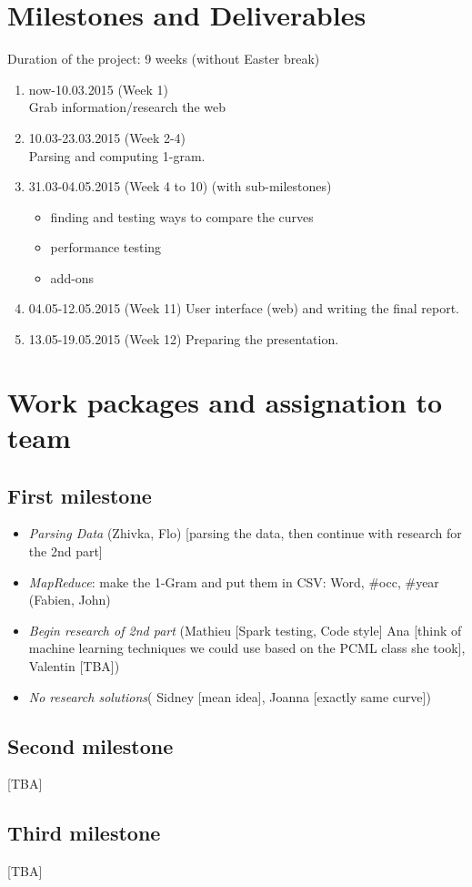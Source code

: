 \documentclass{article}
\begin{document}
\section{Milestones and Deliverables}
Duration of the project: 9 weeks (without Easter break)
\begin{enumerate}
\item now-10.03.2015 (Week 1)\\
Grab information/research the web
\item 10.03-23.03.2015 (Week 2-4)\\
Parsing and computing 1-gram.
\item 31.03-04.05.2015 (Week 4 to 10) (with sub-milestones) \\
\begin{itemize}
\item finding and testing ways to compare the curves 
\item performance testing 
\item add-ons
\end{itemize}
\item 04.05-12.05.2015 (Week 11) 
User interface (web) and writing the final report.
\item 13.05-19.05.2015 (Week 12)
Preparing the presentation.


\end{enumerate}

\section{Work packages and assignation to team}
\subsection{First milestone}
\begin{itemize}
\item \textit{Parsing Data} (Zhivka, Flo) [parsing the data, then continue with research for the 2nd part]
\item\textit{ MapReduce}: make the 1-Gram and put them in CSV: Word, $\#$occ, $\#$year (Fabien, John)
\item \textit{Begin research of 2nd part} (Mathieu [Spark testing, Code style] Ana [think of machine learning techniques we could use based on the PCML class she took], Valentin [TBA])
\item \textit{No research solutions}( Sidney [mean idea], Joanna [exactly same curve])
\end{itemize}
\subsection{Second milestone}
[TBA]
\subsection{Third milestone}
[TBA]
\end{document}
